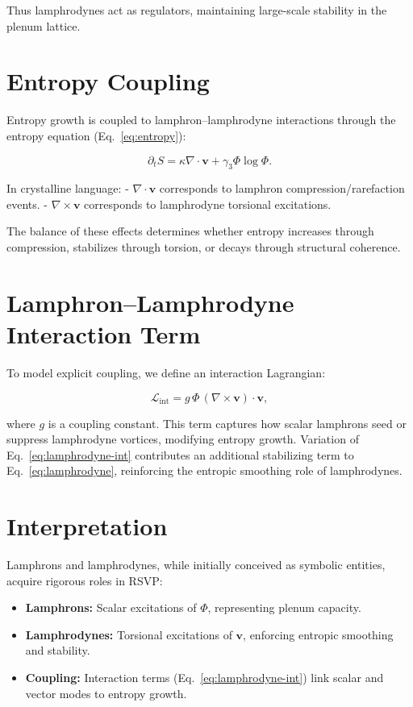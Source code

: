 \documentclass[12pt]{report}
\begin{document}
Thus lamphrodynes act as regulators, maintaining large-scale stability in the plenum lattice.

\section{Entropy Coupling}

Entropy growth is coupled to lamphron--lamphrodyne interactions through the entropy equation (Eq.~\eqref{eq:entropy}):

\begin{equation}
\partial_t S = \kappa \nabla \cdot \mathbf{v} + \gamma_3 \Phi \log \Phi.
\end{equation}

In crystalline language:
- $\nabla \cdot \mathbf{v}$ corresponds to lamphron compression/rarefaction events.
- $\nabla \times \mathbf{v}$ corresponds to lamphrodyne torsional excitations.

The balance of these effects determines whether entropy increases through compression, stabilizes through torsion, or decays through structural coherence.

\section{Lamphron--Lamphrodyne Interaction Term}

To model explicit coupling, we define an interaction Lagrangian:

\begin{equation}
\mathcal{L}_{\text{int}} = g \, \Phi \, (\nabla \times \mathbf{v}) \cdot \mathbf{v},
\label{eq:lamphrodyne-int}
\end{equation}

where $g$ is a coupling constant. This term captures how scalar lamphrons seed or suppress lamphrodyne vortices, modifying entropy growth.  
Variation of Eq.~\eqref{eq:lamphrodyne-int} contributes an additional stabilizing term to Eq.~\eqref{eq:lamphrodyne}, reinforcing the entropic smoothing role of lamphrodynes.

\section{Interpretation}

Lamphrons and lamphrodynes, while initially conceived as symbolic entities, acquire rigorous roles in RSVP:

\begin{itemize}
    \item \textbf{Lamphrons:} Scalar excitations of $\Phi$, representing plenum capacity.  
    \item \textbf{Lamphrodynes:} Torsional excitations of $\mathbf{v}$, enforcing entropic smoothing and stability.  
    \item \textbf{Coupling:} Interaction terms (Eq.~\ref{eq:lamphrodyne-int}) link scalar and vector modes to entropy growth.  
\end{itemize}
\end{document}
